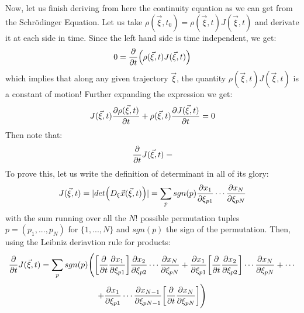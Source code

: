 \documentclass[11pt, a4paper]{article} %
\begin{document}
{Now, let us finish deriving from here the continuity equation as we can get from the Schrödinger Equation. Let us take $\rho(\vec{\xi},t_0) = \rho(\vec{\xi},t) J(\vec{\xi},t)$ and derivate it at each side in time. Since the left hand side is time independent, we get:
\begin{equation}
0=\pdv{}{t}\qty( \rho(\vec{\xi},t) J(\vec{\xi},t))
\end{equation}
which implies that along any given trajectory $\vec{\xi}$, the quantity $\rho(\vec{\xi},t) J(\vec{\xi},t)$ is a constant of motion! Further expanding the expression we get:
\begin{equation}\label{Jacobproc0}
J(\vec{\xi},t)\pdv{\rho(\vec{\xi},t)}{t}+\rho(\vec{\xi},t)\pdv{J(\vec{\xi},t)}{t}=0
\end{equation}
Then note that:
\begin{equation}
\pdv{}{t}J(\vec{\xi},t)=
\end{equation}
To prove this, let us write the definition of determinant in all of its glory:
\begin{equation}
J(\vec{\xi},t)=|det \Big( D_\xi \vec{x}(\vec{\xi},t) \Big)|=\sum_p sgn(p) \pdv{x_1}{\xi_{p1}} \cdots \pdv{x_N}{\xi_{pN}}
\end{equation}
with the sum running over all the $N!$ possible permutation tuples $p=(p_1,...,p_N)$ for $\{1,...,N\}$ and $sgn(p)$ the sign of the permutation. Then, using the Leibniz deriavtion rule for products:
\begin{equation}\label{Jacobproc}
\pdv{}{t}J(\vec{\xi},t)=\sum_p sgn(p) \Bigg(\qty[\pdv{}{t}\pdv{x_1}{\xi_{p1}}]\pdv{x_2}{\xi_{p2}} \cdots \pdv{x_N}{\xi_{pN}}+\pdv{x_1}{\xi_{p1}}\qty[\pdv{}{t}\pdv{x_2}{\xi_{p2}}] \cdots \pdv{x_N}{\xi_{pN}}+\cdots
\end{equation}
$$
+\pdv{x_1}{\xi_{p1}} \cdots \pdv{x_{N-1}}{\xi_{pN-1}}\qty[\pdv{}{t}\pdv{x_N}{\xi_{pN}}]\Bigg)
$$
}
\end{document}
